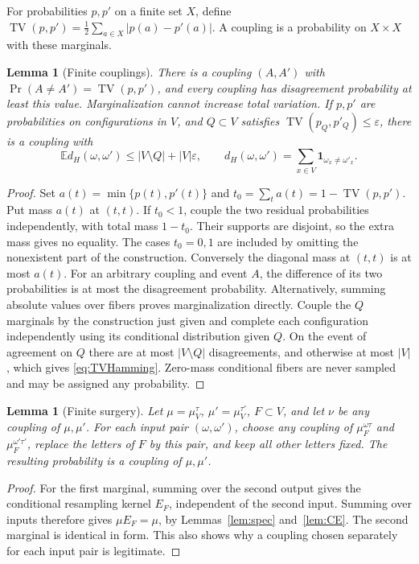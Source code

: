 \documentclass[11pt]{amsart}
\newtheorem{lemma}[theorem]{Lemma}
\theoremstyle{definition}
\newcommand{\E}{\mathbb E}
\newcommand{\TV}{\operatorname{TV}}
\newcommand{\1}{\mathbf 1}
\begin{document}
For probabilities $p,p'$ on a finite set $X$, define
$\TV(p,p')=\frac12\sum_{a\in X}|p(a)-p'(a)|$.
A coupling is a probability on $X\times X$ with these marginals.

\begin{lemma}[Finite couplings]
\label{lem:coupling}
There is a coupling $(A,A')$ with
$\Pr(A\ne A')=\TV(p,p')$, and every coupling has disagreement probability
at least this value. Marginalization cannot increase total variation.
If $p,p'$ are probabilities on configurations in $V$, and $Q\subset V$
satisfies $\TV(p_Q,p'_Q)\le\varepsilon$, there is a coupling with
\begin{equation}\label{eq:TVHamming}
 \E d_H(\omega,\omega')\le |V\setminus Q|+|V|\varepsilon,
 \qquad d_H(\omega,\omega')=\sum_{x\in V}\1_{\omega_x\ne\omega'_x}.
\end{equation}
\end{lemma}
\begin{proof}
Set $a(t)=\min\{p(t),p'(t)\}$ and
$t_0=\sum_t a(t)=1-\TV(p,p')$.
Put mass $a(t)$ at $(t,t)$. If $t_0<1$, couple the two residual
probabilities independently, with total mass $1-t_0$. Their supports are
disjoint, so the extra mass gives no equality. The cases $t_0=0,1$ are
included by omitting the nonexistent part of the construction.
Conversely the diagonal mass at $(t,t)$ is at most $a(t)$.
For an arbitrary coupling and event $A$, the difference of its two
probabilities is at most the disagreement probability. Alternatively,
summing absolute values over fibers proves marginalization directly.
Couple the $Q$ marginals by the construction just given and complete each
configuration independently using its conditional distribution given $Q$.
On the event of agreement on $Q$ there are at most $|V\setminus Q|$
disagreements, and otherwise at most $|V|$, which gives
\eqref{eq:TVHamming}. Zero-mass conditional fibers are never sampled and
may be assigned any probability.
\end{proof}

\begin{lemma}[Finite surgery]
\label{lem:surgery}
Let $\mu=\mu_V^\tau$, $\mu'=\mu_V^{\tau'}$, $F\subset V$, and let $\nu$
be any coupling of $\mu,\mu'$. For each input pair $(\omega,\omega')$,
choose any coupling of
$\mu_F^{\omega\tau}$ and $\mu_F^{\omega'\tau'}$, replace the letters of
$F$ by this pair, and keep all other letters fixed. The resulting
probability is a coupling of $\mu,\mu'$.
\end{lemma}
\begin{proof}
For the first marginal, summing over the second output gives the conditional
resampling kernel $E_F$, independent of the second input. Summing over
inputs therefore gives $\mu E_F=\mu$, by Lemmas~\ref{lem:spec}
and~\ref{lem:CE}. The second marginal is identical in form. This also
shows why a coupling chosen separately for each input pair is legitimate.
\end{proof}
\end{document}

